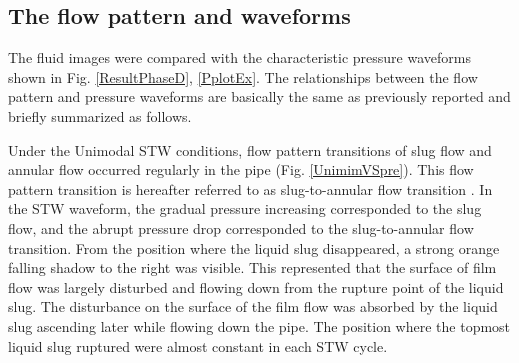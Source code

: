 \documentclass[aps,pre,preprint,groupedaddress,showkeys]{revtex4-2}
\begin{document}
\subsection{The flow pattern and waveforms}\label{PandF}
The fluid images were compared with the characteristic pressure waveforms shown in Fig. \ref{ResultPhaseD}, \ref{PplotEx}.
The relationships between the flow pattern and pressure waveforms are basically the same as previously reported and briefly summarized as follows.


Under the Unimodal STW conditions, flow pattern transitions of slug flow and annular flow occurred regularly in the pipe (Fig. \ref{UnimimVSpre}). 
This flow pattern transition is hereafter referred to as slug-to-annular flow transition \citep{kanno2018}.
In the STW waveform, the gradual pressure increasing corresponded to the slug flow, and the abrupt pressure drop corresponded to the slug-to-annular flow transition.
From the position where the liquid slug disappeared, a strong orange falling shadow to the right was visible.
This represented that the surface of film flow was largely disturbed and flowing down from the rupture point of the liquid slug.
The disturbance on the surface of the film flow was absorbed by the liquid slug ascending later while flowing down the pipe.
The position where the topmost liquid slug ruptured were almost constant in each STW cycle.
\end{document}
